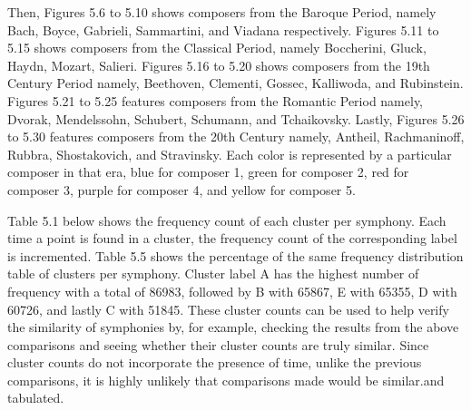 Then, Figures 5.6 to 5.10 shows composers from the Baroque Period, namely Bach, Boyce, Gabrieli, Sammartini, and Viadana respectively. Figures 5.11 to 5.15 shows composers from the Classical Period, namely Boccherini, Gluck, Haydn, Mozart, Salieri. Figures 5.16 to 5.20 shows composers from the 19th Century Period namely, Beethoven, Clementi, Gossec, Kalliwoda, and Rubinstein. Figures 5.21 to 5.25 features composers from the Romantic Period namely, Dvorak, Mendelssohn, Schubert, Schumann, and Tchaikovsky. Lastly, Figures 5.26 to 5.30 features composers from the 20th Century namely, Antheil, Rachmaninoff, Rubbra, Shostakovich, and Stravinsky. Each color is represented by a particular composer in that era, blue for composer 1, green for composer 2, red for composer 3, purple for composer 4, and yellow for composer 5.

Table 5.1 below shows the frequency count of each cluster per symphony. Each time a point is found in a cluster, the frequency count of the corresponding label is incremented. Table 5.5 shows the percentage of the same frequency distribution table of clusters per symphony. Cluster label A has the highest number of frequency with a total of 86983, followed by B with 65867, E with 65355, D with 60726, and lastly C with 51845. These cluster counts can be used to help verify the similarity of symphonies by, for example, checking the results from the above comparisons and seeing whether their cluster counts are truly similar. Since cluster counts do not incorporate the presence of time, unlike the previous comparisons, it is highly unlikely that comparisons made would be similar.and tabulated.

